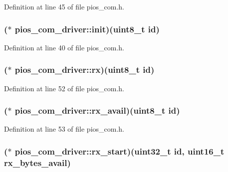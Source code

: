 Definition at line 45 of file pios\-\_\-com.\-h.

\hypertarget{structpios__com__driver_a985b9b538b715cba9b4e6996092a5784}{
\subsubsection[{init}]{($\ast$ pios\-\_\-com\-\_\-driver\-::init)({\bf uint8\-\_\-t} {\bf id})}}\label{structpios__com__driver_a985b9b538b715cba9b4e6996092a5784}


Definition at line 40 of file pios\-\_\-com.\-h.

\hypertarget{structpios__com__driver_a4301f269ed00f747ec7938f55ac2cc13}{
\subsubsection[{rx}]{($\ast$ pios\-\_\-com\-\_\-driver\-::rx)({\bf uint8\-\_\-t} {\bf id})}}\label{structpios__com__driver_a4301f269ed00f747ec7938f55ac2cc13}


Definition at line 52 of file pios\-\_\-com.\-h.

\hypertarget{structpios__com__driver_a2c69f560a37a9be69a06e7d7841e6e23}{
\subsubsection[{rx\-\_\-avail}]{($\ast$ pios\-\_\-com\-\_\-driver\-::rx\-\_\-avail)({\bf uint8\-\_\-t} {\bf id})}}\label{structpios__com__driver_a2c69f560a37a9be69a06e7d7841e6e23}


Definition at line 53 of file pios\-\_\-com.\-h.

\hypertarget{structpios__com__driver_a0c6384ecc39e1e638dddb2570602f7ff}{
\subsubsection[{rx\-\_\-start}]{($\ast$ pios\-\_\-com\-\_\-driver\-::rx\-\_\-start)({\bf uint32\-\_\-t} {\bf id}, {\bf uint16\-\_\-t} rx\-\_\-bytes\-\_\-avail)}}\label{structpios__com__driver_a0c6384ecc39e1e638dddb2570602f7ff}


